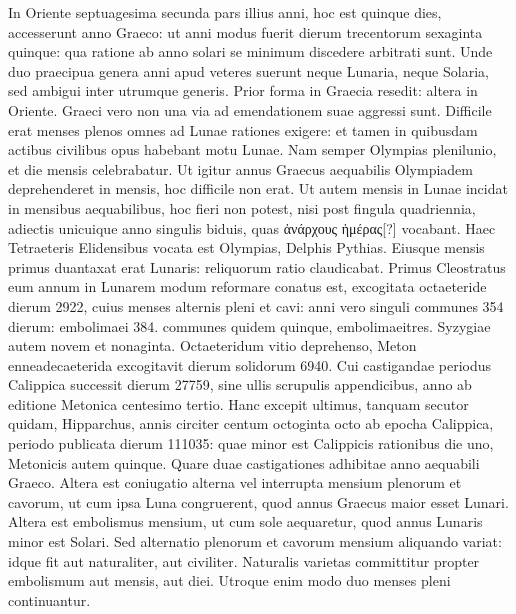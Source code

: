 In Oriente
septuagesima secunda pars illius anni, hoc est quinque dies, accesserunt
anno Graeco: ut anni modus fuerit dierum trecentorum sexaginta quinque:
qua ratione ab anno solari se minimum discedere arbitrati sunt.
Unde duo praecipua genera anni apud veteres suerunt neque Lunaria,
neque Solaria, sed ambigui inter utrumque generis.
Prior forma in
Graecia resedit: altera in Oriente.
Graeci vero non una via ad emendationem
suae aggressi sunt.
Difficile erat menses plenos omnes ad
Lunae rationes exigere: et tamen in quibusdam actibus civilibus opus
habebant motu Lunae.
Nam semper Olympias plenilunio, et 
die mensis celebrabatur.
Ut igitur annus Graecus aequabilis Olympiadem
deprehenderet in  mensis, hoc difficile non erat.
Ut autem
 mensis in 
 Lunae incidat in mensibus aequabilibus, hoc fieri non
potest, nisi post fingula quadriennia, adiectis unicuique anno singulis
biduis, quas \textgreek{ἀνάρχους ἡμέρας[?]} vocabant.
Haec Tetraeteris Elidensibus
vocata est Olympias, Delphis Pythias.
Eiusque mensis primus duantaxat
erat Lunaris: reliquorum ratio claudicabat.
Primus Cleostratus
eum annum in Lunarem modum reformare conatus est, excogitata
octaeteride dierum 2922, cuius menses alternis pleni et cavi: anni vero
singuli communes 354 dierum: embolimaei 384. communes quidem
quinque, embolimaeitres.
Syzygiae autem novem et nonaginta.
Octaeteridum
vitio deprehenso, Meton enneadecaeterida excogitavit dierum
solidorum 6940.
Cui castigandae periodus Calippica successit dierum
27759, sine ullis scrupulis appendicibus, anno ab editione Metonica
centesimo tertio.
Hanc excepit ultimus, tanquam secutor quidam,
Hipparchus, annis circiter centum octoginta octo ab epocha Calippica,
periodo publicata dierum 111035: quae minor est Calippicis rationibus
die uno, Metonicis autem quinque.
Quare duae castigationes adhibitae
anno aequabili Graeco.
Altera est coniugatio alterna vel interrupta
mensium plenorum et cavorum, ut cum ipsa Luna congruerent, quod
annus Graecus maior esset Lunari.
Altera est embolismus mensium, ut
cum sole aequaretur, quod annus Lunaris minor est Solari.
Sed alternatio
plenorum et cavorum mensium aliquando variat: idque fit aut
naturaliter, aut civiliter.
Naturalis varietas committitur propter embolismum
aut mensis, aut diei.
%
Utroque enim modo duo menses pleni continuantur.
